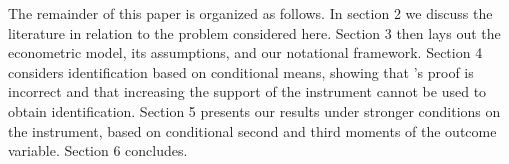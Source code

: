 The remainder of this paper is organized as follows. 
In section 2 we discuss the literature in relation to the problem considered here. 
Section 3 then lays out the econometric model, its assumptions, and our notational framework. 
Section 4 considers identification based on conditional means, showing that \citeauthor{Mahajan}'s proof is incorrect and that increasing the support of the instrument cannot be used to obtain identification.
Section 5 presents our results under stronger conditions on the instrument, based on conditional second and third moments of the outcome variable.
Section 6 concludes.  

